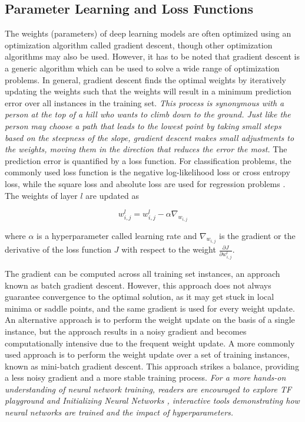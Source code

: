 \documentclass[preprint,12pt]{elsarticle}
\begin{document}
\subsection{Parameter Learning and Loss Functions}
The weights (parameters) of deep learning models are often optimized using an optimization algorithm called gradient descent, though other optimization algorithms may also be used. However, it has to be noted that gradient descent is a generic algorithm which can be used to solve a wide range of optimization problems. In general, gradient descent finds the optimal weights by iteratively updating the weights such that the weights will result in a minimum prediction error over all instances in the training set. \emph{This process is synonymous with a person at the top of a hill who wants to climb down to the ground. Just like the person may choose a path that leads to the lowest point by taking small steps based on the steepness of the slope, gradient descent makes small adjustments to the weights, moving them in the direction that reduces the error the most.} The prediction error is quantified by a loss function. For classification problems, the commonly used loss function is the negative log-likelihood loss or cross entropy loss, while the square loss and absolute loss are used for regression problems \citep{wang_comprehensive_2022}. The weights of layer $l$ are updated as

\begin{equation}
{w_{i,j}^l = w_{i,j}^l - \alpha \nabla_{w_{i,j}}}
\end{equation}

\noindent where $\alpha$ is a hyperparameter called learning rate and $\nabla_{w_{i,j}}$ is the gradient or the derivative of the loss function $J$ with respect to the weight $\frac{\partial J}{\partial w_{i,j}^l}$.

The gradient can be computed across all training set instances, an approach known as batch gradient descent. However, this approach does not always guarantee convergence to the optimal solution, as it may get stuck in local minima or saddle points, and the same gradient is used for every weight update. An alternative approach is to perform the weight update on the basis of a single instance, but the approach results in a noisy gradient and becomes computationally intensive due to the frequent weight update. A more commonly used approach is to perform the weight update over a set of training instances, known as mini-batch gradient descent. This approach strikes a balance, providing a less noisy gradient and a more stable training process. \emph{For a more hands-on understanding of neural network training, readers are encouraged to explore TF playground \citep{carter_tensorflow_nodate} and Initializing Neural Networks \citep{guo_ai_nodate}, interactive tools demonstrating how neural networks are trained and the impact of hyperparameters.}
\end{document}
